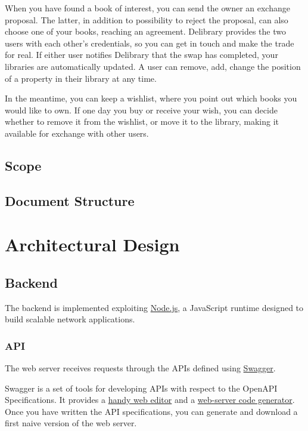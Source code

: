 When you have found a book of interest, you can send the owner an exchange proposal. The latter, in addition to possibility to reject the proposal, can also choose one of your books, reaching an agreement.
Delibrary provides the two users with each other's credentials, so you can get in touch and make the trade for real. If either user notifies Delibrary that the swap has completed, your libraries are automatically updated.
A user can remove, add, change the position of a property in their library at any time.

In the meantime, you can keep a wishlist, where you point out  which books you would like to own.
If one day you buy or receive your wish, you can decide whether to remove it from the wishlist, or move it to the library, making it available for exchange with other users.

\section{Scope}

\section{Document Structure}



\chapter{Architectural Design}

\section{Backend}
The backend is implemented exploiting \href{https://nodejs.org}{Node.js}, a JavaScript runtime designed to build scalable network applications.

\subsection{API}
The web server receives requests through the APIs defined using \href{https://swagger.io}{Swagger}.

Swagger is a set of tools for developing APIs with respect to the OpenAPI Specifications.
It provides a \href{https://editor.swagger.io}{handy web editor} and a \href{https://swagger.io/tools/swagger-codegen}{web-server code generator}.
Once you have written the API specifications, you can generate and download a first naive version of the web server.

